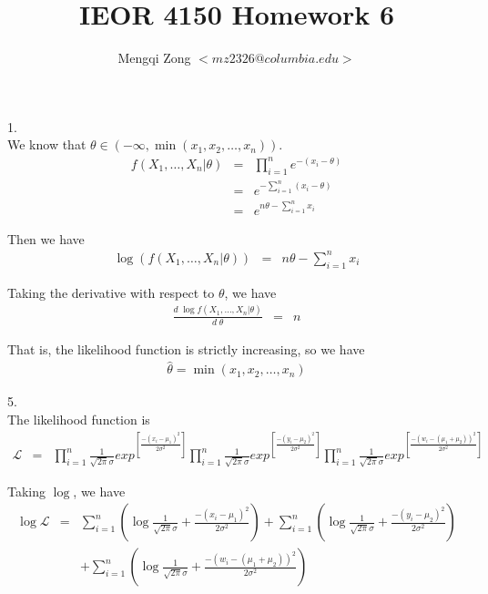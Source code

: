 \documentclass[12pt]{article}
\title{IEOR 4150 Homework 6}
\author{Mengqi Zong $<mz2326@columbia.edu>$}
\begin{document}
\maketitle

\setlength{\parindent}{0in}

1. \\

We know that $\theta \in (-\infty, \min (x_1, x_2, \dots, x_n))$.
\begin{eqnarray*}
  f(X_1, \dots, X_n | \theta)
  &=& \prod_{i=1}^n e^{-(x_i - \theta)} \\
  &=& e^{- \sum_{i=1}^n (x_i - \theta)} \\
  &=& e^{n \theta - \sum_{i=1}^n x_i}
\end{eqnarray*}

Then we have
\begin{eqnarray*}
  \log {\left( f(X_1, \dots, X_n | \theta) \right)}
  &=& n \theta - \sum_{i=1}^n x_i
\end{eqnarray*}

Taking the derivative with respect to $\theta$, we have
\begin{eqnarray*}
  \frac {d \; \log f(X_1, \dots, X_n | \theta)}{d \; \theta}
  &=& n
\end{eqnarray*}

That is, the likelihood function is strictly increasing, so we have
\begin{eqnarray*}
  \hat{\theta} = \min (x_1, x_2, \dots, x_n)
\end{eqnarray*}

5. \\

The likelihood function is
\begin{eqnarray*}
  \mathcal{L}
  &=& \prod_{i=1}^n \frac {1}{\sqrt{2\pi} \sigma}
  exp^{\left[ \frac{-(x_i - \mu_1)^2}{2\sigma^2} \right]}
  \prod_{i=1}^n \frac {1}{\sqrt{2\pi} \sigma}
  exp^{\left[ \frac{-(y_i - \mu_2)^2}{2\sigma^2} \right]}
  \prod_{i=1}^n \frac {1}{\sqrt{2\pi} \sigma}
  exp^{\left[ \frac{-(w_i - (\mu_1+\mu_2))^2}{2\sigma^2} \right]}
\end{eqnarray*}

Taking $\log$, we have
\begin{eqnarray*}
  \log {\mathcal{L}}
  &=& \sum_{i=1}^n \left( \log {\frac {1}{\sqrt{2\pi} \sigma}} +
    \frac{-(x_i - \mu_1)^2}{2\sigma^2} \right) + 
  \sum_{i=1}^n \left( \log {\frac {1}{\sqrt{2\pi} \sigma}} +
    \frac{-(y_i - \mu_2)^2}{2\sigma^2} \right) \\
  && + \sum_{i=1}^n \left( \log {\frac {1}{\sqrt{2\pi} \sigma}} +
    \frac{-(w_i - (\mu_1+\mu_2))^2}{2\sigma^2} \right)
\end{eqnarray*}
\end{document}
